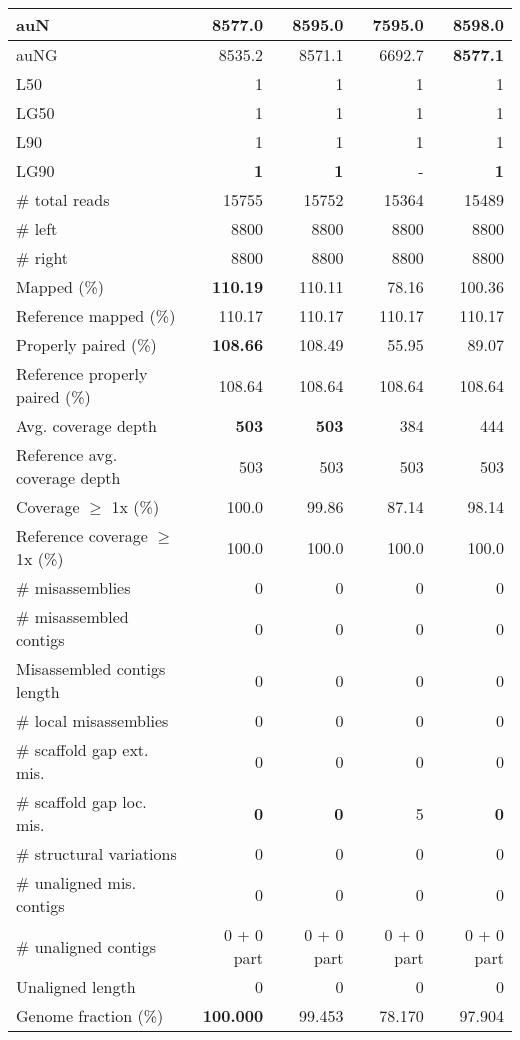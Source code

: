 \documentclass[12pt,a4paper]{article}
\begin{document}
\begin{table}[ht]
\begin{center}
\begin{tabular}{|l*{4}{|r}|}
auN & 8577.0 & 8595.0 & 7595.0 & {\bf 8598.0} \\ \hline
auNG & 8535.2 & 8571.1 & 6692.7 & {\bf 8577.1} \\ \hline
L50 & 1 & 1 & 1 & 1 \\ \hline
LG50 & 1 & 1 & 1 & 1 \\ \hline
L90 & 1 & 1 & 1 & 1 \\ \hline
LG90 & {\bf 1} & {\bf 1} & - & {\bf 1} \\ \hline
\# total reads & 15755 & 15752 & 15364 & 15489 \\ \hline
\# left & 8800 & 8800 & 8800 & 8800 \\ \hline
\# right & 8800 & 8800 & 8800 & 8800 \\ \hline
Mapped (\%) & {\bf 110.19} & 110.11 & 78.16 & 100.36 \\ \hline
Reference mapped (\%) & 110.17 & 110.17 & 110.17 & 110.17 \\ \hline
Properly paired (\%) & {\bf 108.66} & 108.49 & 55.95 & 89.07 \\ \hline
Reference properly paired (\%) & 108.64 & 108.64 & 108.64 & 108.64 \\ \hline
Avg. coverage depth & {\bf 503} & {\bf 503} & 384 & 444 \\ \hline
Reference avg. coverage depth & 503 & 503 & 503 & 503 \\ \hline
Coverage $\geq$ 1x (\%) & 100.0 & 99.86 & 87.14 & 98.14 \\ \hline
Reference coverage $\geq$ 1x (\%) & 100.0 & 100.0 & 100.0 & 100.0 \\ \hline
\# misassemblies & 0 & 0 & 0 & 0 \\ \hline
\# misassembled contigs & 0 & 0 & 0 & 0 \\ \hline
Misassembled contigs length & 0 & 0 & 0 & 0 \\ \hline
\# local misassemblies & 0 & 0 & 0 & 0 \\ \hline
\# scaffold gap ext. mis. & 0 & 0 & 0 & 0 \\ \hline
\# scaffold gap loc. mis. & {\bf 0} & {\bf 0} & 5 & {\bf 0} \\ \hline
\# structural variations & 0 & 0 & 0 & 0 \\ \hline
\# unaligned mis. contigs & 0 & 0 & 0 & 0 \\ \hline
\# unaligned contigs & 0 + 0 part & 0 + 0 part & 0 + 0 part & 0 + 0 part \\ \hline
Unaligned length & 0 & 0 & 0 & 0 \\ \hline
Genome fraction (\%) & {\bf 100.000} & 99.453 & 78.170 & 97.904 \\ \hline

\end{tabular}
\end{center}
\end{table}
\end{document}
